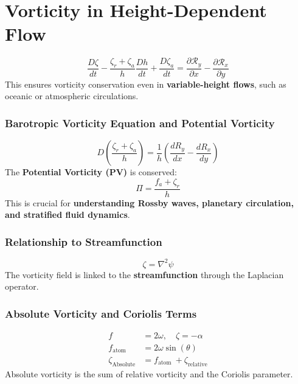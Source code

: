 \documentclass[12pt]{article}
\begin{document}
    \section*{Vorticity in Height-Dependent Flow}
    \begin{equation*}
        \frac{D \zeta}{d t} - \frac{ \zeta_r + \zeta_a }{h}  \frac{D h}{d t} + \frac{D \zeta_a}{d t}  = \frac{\partial \mathcal{R}_y}{\partial x} - \frac{\partial \mathcal{R}_x}{\partial y}
    \end{equation*}
    This ensures vorticity conservation even in \textbf{variable-height flows}, such as oceanic or atmospheric circulations.

    \subsubsection*{Barotropic Vorticity Equation and Potential Vorticity}
    \begin{equation*}
        D\left(\frac{\zeta_r+\zeta_a}{h}\right)=\frac{1}{h}\left(\frac{d R_y}{d x}-\frac{d R_x}{d y}\right)
    \end{equation*}
    The \textbf{Potential Vorticity (PV)} is conserved:
    \begin{equation*}
        \Pi = \frac{f_a+\zeta_r}{h}
    \end{equation*}
    This is crucial for \textbf{understanding Rossby waves, planetary circulation, and stratified fluid dynamics}.

    \subsubsection*{Relationship to Streamfunction}
    \begin{equation*}
        \zeta = \nabla^2 \psi
    \end{equation*}
    The vorticity field is linked to the \textbf{streamfunction} through the Laplacian operator.

    \subsubsection*{Absolute Vorticity and Coriolis Terms}
    \begin{align}
        f &= 2 \omega, \quad \zeta=-\alpha \\
        f_\text{atom} &= 2 \omega \sin (\theta) \\
        \zeta_\text{Absolute} &= f_\text{atom }+\zeta_\text{relative}
    \end{align}
    Absolute vorticity is the sum of relative vorticity and the Coriolis parameter.
\end{document}
